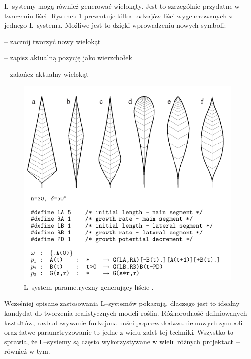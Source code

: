 \documentclass[inz,shortabstract]{iithesis}
\begin{document}
        L--systemy mogą również generować wielokąty. Jest to szczególnie przydatne w tworzeniu liści. Rysunek \ref{fig:lsystemLeafs} prezentuje kilka rodzajów liści wygenerowanych z jednego L--systemu. Możliwe jest to dzięki wprowadzeniu nowych symboli:
        \begin{description}[itemsep=2pt, parsep=2pt, topsep=2pt, partopsep=2pt]
            \item[\text{\{}] -- zacznij tworzyć nowy wielokąt 
            \item[.] -- zapisz aktualną pozycję jako wierzchołek
            \item[\text{\}}] -- zakończ aktualny wielokąt
        \end{description}
        \begin{figure}[H]
            \includegraphics[width=\linewidth]{lsystemLeafs.png}
            \caption{L--system parametryczny generujący liście \cite{plants}.} 
            \label{fig:lsystemLeafs}
        \end{figure}
        
        Wcześniej opisane zastosowania L--systemów pokazują, dlaczego jest to idealny kandydat do tworzenia realistycznych modeli roślin. Różnorodność definiowanych kształtów, rozbudowywanie funkcjonalności poprzez dodawanie nowych symboli oraz łatwe parametryzowanie to jedne z wielu zalet tej techniki. Wszystko to sprawia, że L--systemy są często wykorzystywane w wielu różnych projektach -- również w tym. 
        
\end{document}
